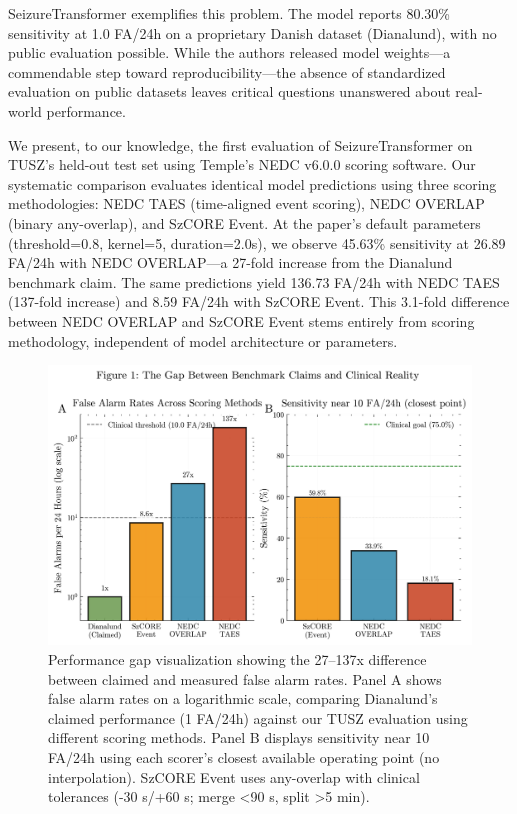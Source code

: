 \documentclass[10pt]{article}
\begin{document}
SeizureTransformer exemplifies this problem. The model reports 80.30\% sensitivity at 1.0 FA/24h on a proprietary Danish dataset (Dianalund), with no public evaluation possible. While the authors released model weights—a commendable step toward reproducibility—the absence of standardized evaluation on public datasets leaves critical questions unanswered about real-world performance.

We present, to our knowledge, the first evaluation of SeizureTransformer on TUSZ's held-out test set using Temple's NEDC v6.0.0 scoring software. Our systematic comparison evaluates identical model predictions using three scoring methodologies: NEDC TAES (time-aligned event scoring), NEDC OVERLAP (binary any-overlap), and SzCORE Event. At the paper's default parameters (threshold=0.8, kernel=5, duration=2.0s), we observe 45.63\% sensitivity at 26.89 FA/24h with NEDC OVERLAP—a 27-fold increase from the Dianalund benchmark claim. The same predictions yield 136.73 FA/24h with NEDC TAES (137-fold increase) and 8.59 FA/24h with SzCORE Event. This 3.1-fold difference between NEDC OVERLAP and SzCORE Event stems entirely from scoring methodology, independent of model architecture or parameters.

\begin{figure}[h]
\centering
\includegraphics[width=\textwidth]{figures/output/arxiv/fig1_performance_gap.png}
\caption{Performance gap visualization showing the 27–137x difference between claimed and measured false alarm rates. Panel A shows false alarm rates on a logarithmic scale, comparing Dianalund's claimed performance (1 FA/24h) against our TUSZ evaluation using different scoring methods. Panel B displays sensitivity near 10 FA/24h using each scorer's closest available operating point (no interpolation). SzCORE Event uses any-overlap with clinical tolerances (-30 s/+60 s; merge <90 s, split >5 min).}
\label{fig:performance-gap}
\end{figure}
\end{document}
